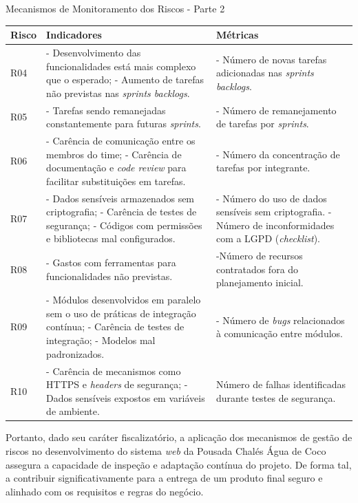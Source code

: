 \documentclass[
	12pt,				%
	openany,			%
	oneside,			%
	a4paper,			%
	english,			%
	french,				%
	spanish,			%
	brazil				%
	]{abntex2}
\begin{document}
 \begin{quadro}[H]
	\caption{Mecanismos de Monitoramento dos Riscos - Parte 2}
	\label{monitoramento_riscos_2} 
	\begin{tabular} {|>{\centering\arraybackslash}m{2.2cm}|p{6cm}|p{6cm}|}
		\hline
		\textbf{Risco} & \textbf{Indicadores} & \textbf{Métricas} \\
		\hline
		R04 & 	- Desenvolvimento das funcionalidades está mais complexo que o esperado; \newline
		- Aumento de tarefas não previstas nas \textit{sprints backlogs}.
		& - Número de novas tarefas adicionadas nas \textit{sprints backlogs}. 
		\\	\hline
		R05 & - Tarefas sendo remanejadas constantemente para futuras \textit{sprints}. & - Número de remanejamento de tarefas por \textit{sprints}. 
		\\ \hline
		R06 & - Carência de comunicação entre os membros do time; \newline
		- Carência de documentação e \textit{code review} para facilitar substituições em tarefas. & - Número da concentração de tarefas por integrante. 
		\\	\hline
		R07 & - Dados sensíveis armazenados sem criptografia; \newline
		- Carência de testes de segurança; \newline
		- Códigos com permissões e bibliotecas mal configurados.
		& - Número do uso de dados sensíveis sem criptografia. \newline
		- Número de inconformidades com a LGPD (\textit{checklist}). 
		\\	\hline
		R08 & 	- Gastos com ferramentas para funcionalidades não previstas.
		& -Número de recursos contratados fora do planejamento inicial.
		\\	\hline
		R09 & 	- Módulos desenvolvidos em paralelo sem o uso de práticas de integração contínua; \newline
		- Carência de testes de integração; \newline
		- Modelos mal padronizados.
		& - Número de \textit{bugs} relacionados à comunicação entre módulos.
		\\	\hline
		R10 & 	- Carência de mecanismos como HTTPS e \textit{headers} de segurança; \newline
		- Dados sensíveis expostos em variáveis de ambiente.
		& Número de falhas identificadas durante testes de segurança.
		\\ \hline
	\end{tabular}
\end{quadro}
Portanto, dado seu caráter fiscalizatório, a aplicação dos mecanismos de  gestão de riscos no desenvolvimento do sistema \textit{web} da Pousada Chalés Água de Coco assegura a capacidade de inspeção e adaptação contínua do projeto. De forma tal, a contribuir significativamente para a entrega de um produto final seguro e alinhado com os requisitos e regras do negócio. 
\end{document}
